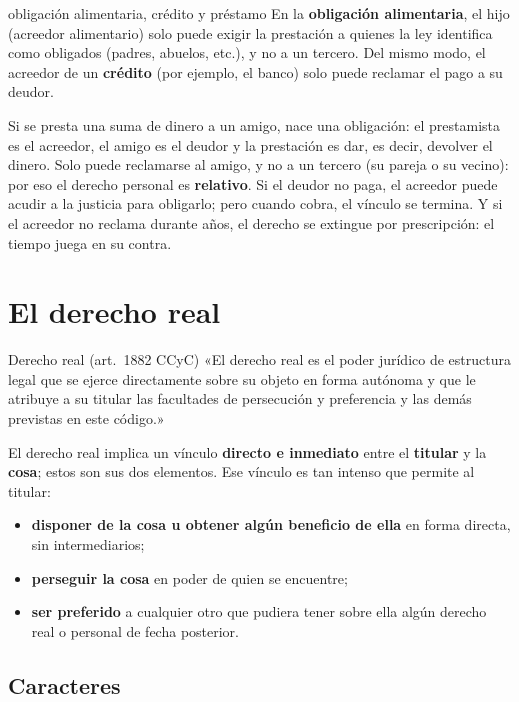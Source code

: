 \documentclass[12pt,oneside]{book}
\begin{document}
\begin{ejemplo}{obligación alimentaria, crédito y préstamo}
En la \textbf{obligación alimentaria}, el hijo (acreedor alimentario) solo puede exigir la prestación a quienes la ley identifica como obligados (padres, abuelos, etc.), y no a un tercero. Del mismo modo, el acreedor de un \textbf{crédito} (por ejemplo, el banco) solo puede reclamar el pago a su deudor.

Si se presta una suma de dinero a un amigo, nace una obligación: el prestamista es el acreedor, el amigo es el deudor y la prestación es dar, es decir, devolver el dinero. Solo puede reclamarse al amigo, y no a un tercero (su pareja o su vecino): por eso el derecho personal es \textbf{relativo}. Si el deudor no paga, el acreedor puede acudir a la justicia para obligarlo; pero cuando cobra, el vínculo se termina. Y si el acreedor no reclama durante años, el derecho se extingue por prescripción: el tiempo juega en su contra.
\end{ejemplo}

\section{El derecho real}

\begin{definicion}{Derecho real (art.~1882 CCyC)}
«El derecho real es el poder jurídico de estructura legal que se ejerce directamente sobre su objeto en forma autónoma y que le atribuye a su titular las facultades de persecución y preferencia y las demás previstas en este código.»
\end{definicion}

El derecho real implica un vínculo \textbf{directo e inmediato} entre el \textbf{titular} y la \textbf{cosa}; estos son sus dos elementos. Ese vínculo es tan intenso que permite al titular:

\begin{itemize}
    \item \textbf{disponer de la cosa u obtener algún beneficio de ella} en forma directa, sin intermediarios;
    \item \textbf{perseguir la cosa} en poder de quien se encuentre;
    \item \textbf{ser preferido} a cualquier otro que pudiera tener sobre ella algún derecho real o personal de fecha posterior.
\end{itemize}

\subsection{Caracteres}
\end{document}
